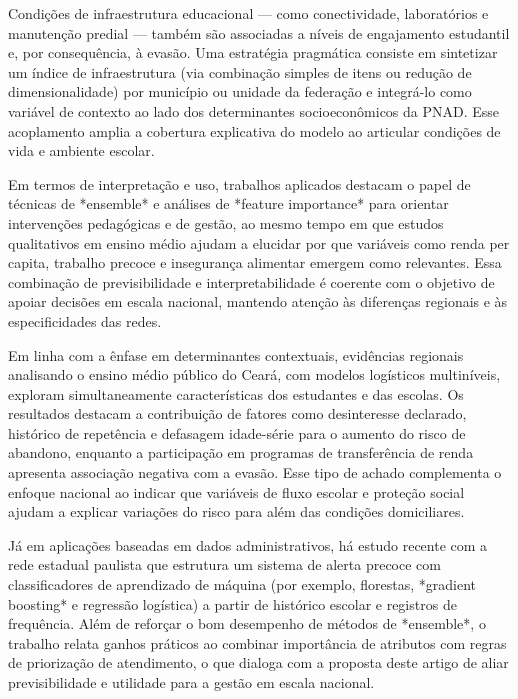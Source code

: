 \documentclass[english, spanish, brazilian]{RBIEarticle} %
\begin{document}
Condições de infraestrutura educacional — como conectividade, laboratórios e manutenção
predial — também são associadas a níveis de engajamento estudantil e, por consequência, à evasão.
Uma estratégia pragmática consiste em sintetizar um índice de infraestrutura (via combinação
simples de itens ou redução de dimensionalidade) por município ou unidade da federação e
integrá-lo como variável de contexto ao lado dos determinantes socioeconômicos da PNAD. Esse
acoplamento amplia a cobertura explicativa do modelo ao articular condições de vida e ambiente
escolar.

Em termos de interpretação e uso, trabalhos aplicados destacam o papel de técnicas de *ensemble*
e análises de *feature importance* para orientar intervenções pedagógicas e de gestão, ao mesmo
tempo em que estudos qualitativos em ensino médio ajudam a elucidar por que variáveis como renda
per capita, trabalho precoce e insegurança alimentar emergem como relevantes. Essa combinação de
previsibilidade e interpretabilidade é coerente com o objetivo de apoiar decisões em escala
nacional, mantendo atenção às diferenças regionais e às especificidades das redes.

Em linha com a ênfase em determinantes contextuais, evidências regionais analisando o ensino
médio público do Ceará, com modelos logísticos multiníveis, exploram simultaneamente
características dos estudantes e das escolas. Os resultados destacam a contribuição de fatores como
desinteresse declarado, histórico de repetência e defasagem idade-série para o aumento do risco de
abandono, enquanto a participação em programas de transferência de renda apresenta associação
negativa com a evasão. Esse tipo de achado complementa o enfoque nacional ao indicar que
variáveis de fluxo escolar e proteção social ajudam a explicar variações do risco para além das
condições domiciliares.

Já em aplicações baseadas em dados administrativos, há estudo recente com a rede estadual
paulista que estrutura um sistema de alerta precoce com classificadores de aprendizado de máquina
(por exemplo, florestas, *gradient boosting* e regressão logística) a partir de histórico escolar e
registros de frequência. Além de reforçar o bom desempenho de métodos de *ensemble*, o trabalho
relata ganhos práticos ao combinar importância de atributos com regras de priorização de
atendimento, o que dialoga com a proposta deste artigo de aliar previsibilidade e utilidade para a
gestão em escala nacional.
\end{document}
